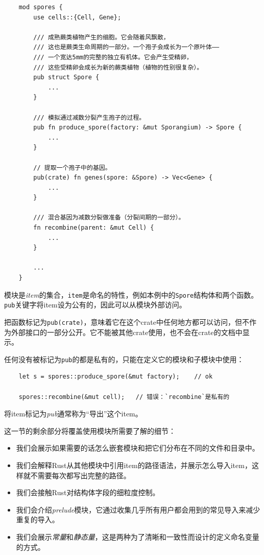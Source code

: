 \begin{verbatim}
    mod spores {
        use cells::{Cell, Gene};

        /// 成熟蕨类植物产生的细胞。它会随着风飘散，
        /// 这也是蕨类生命周期的一部分。一个孢子会成长为一个原叶体——
        /// 一个宽达5mm的完整的独立有机体。它会产生受精卵，
        /// 这些受精卵会成长为新的蕨类植物（植物的性别很复杂）。
        pub struct Spore {
            ...
        }

        /// 模拟通过减数分裂产生孢子的过程。
        pub fn produce_spore(factory: &mut Sporangium) -> Spore {
            ...
        }

        // 提取一个孢子中的基因。
        pub(crate) fn genes(spore: &Spore) -> Vec<Gene> {
            ...
        }

        /// 混合基因为减数分裂做准备（分裂间期的一部分）。
        fn recombine(parent: &mut Cell) {
            ...
        }

        ...
    }
\end{verbatim}

模块是\emph{item}的集合，\texttt{item}是命名的特性，例如本例中的\texttt{Spore}结构体和两个函数。\texttt{pub}关键字将item设为公有的，因此可以从模块外部访问。

把函数标记为\texttt{pub(crate)}，意味着它在这个crate中任何地方都可以访问，但不作为外部接口的一部分公开。它不能被其他crate使用，也不会在crate的文档中显示。

任何没有被标记为\texttt{pub}的都是私有的，只能在定义它的模块和子模块中使用：
\begin{verbatim}
    let s = spores::produce_spore(&mut factory);    // ok
    
    spores::recombine(&mut cell);   // 错误：`recombine`是私有的
\end{verbatim}

将item标记为\emph{pub}通常称为“导出”这个item。

这一节的剩余部分将覆盖使用模块所需要了解的细节：
\begin{itemize}
    \item 我们会展示如果需要的话怎么嵌套模块和把它们分布在不同的文件和目录中。
    \item 我们会解释Rust从其他模块中引用item的路径语法，并展示怎么导入item，这样就不需要每次都写出完整的路径。
    \item 我们会接触Rust对结构体字段的细粒度控制。
    \item 我们会介绍\emph{prelude}模块，它通过收集几乎所有用户都会用到的常见导入来减少重复的导入。
    \item 我们会展示\emph{常量}和\emph{静态量}，这是两种为了清晰和一致性而设计的定义命名变量的方式。
\end{itemize}

